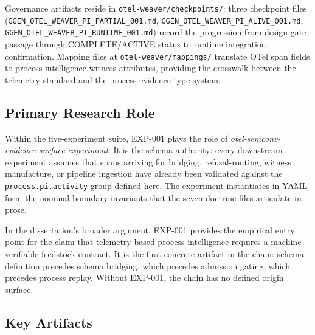 Governance artifacts reside in \texttt{otel-weaver/checkpoints/}: three checkpoint files
(\texttt{GGEN\_OTEL\_WEAVER\_PI\_PARTIAL\_001.md}, \texttt{GGEN\_OTEL\_WEAVER\_PI\_ALIVE\_001.md},
\texttt{GGEN\_OTEL\_WEAVER\_PI\_RUNTIME\_001.md}) record the progression from design-gate passage
through COMPLETE/ACTIVE status to runtime integration confirmation.
Mapping files at \texttt{otel-weaver/mappings/} translate OTel span fields to process intelligence
witness attributes, providing the crosswalk between the telemetry standard and the process-evidence
type system.

\subsection{Primary Research Role}
\label{sec:otel-weaver-exp-001-custom-pi-registry-identity-role}

Within the five-experiment suite, EXP-001 plays the role of \emph{otel-semconv-evidence-surface-experiment}.
It is the schema authority: every downstream experiment assumes that spans arriving for bridging,
refusal-routing, witness manufacture, or pipeline ingestion have already been validated against the
\texttt{process.pi.activity} group defined here. The experiment instantiates in YAML form the
nominal boundary invariants that the seven doctrine files articulate in prose.

In the dissertation's broader argument, EXP-001 provides the empirical entry point for the claim
that telemetry-based process intelligence requires a machine-verifiable feedstock contract. It is the
first concrete artifact in the chain: schema definition precedes schema bridging, which precedes
admission gating, which precedes process replay. Without EXP-001, the chain has no defined
origin surface.

\subsection{Key Artifacts}
\label{sec:otel-weaver-exp-001-custom-pi-registry-identity-artifacts}

